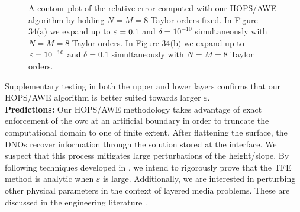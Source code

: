 \begin{figure}[H]
    \centering
    \vspace{3 mm}
    \caption{A contour plot of the relative error computed with our HOPS/AWE algorithm by holding $N=M=8$ Taylor orders fixed. In Figure $34\text{(a)}$ we expand up to $\varepsilon = 0.1$ and $\delta = 10^{-10}$ simultaneously with $N=M=8$ Taylor orders. In Figure $34\text{(b)}$ we expand up to $\varepsilon = 10^{-10}$ and $\delta = 0.1$ simultaneously with $N=M=8$ Taylor orders.}%
    \label{fig:example}%
\end{figure}
\vspace{-18mm}
Supplementary testing in both the upper and lower layers confirms that our HOPS/AWE algorithm is better suited towards larger $\varepsilon$.
\newline
\\
\textbf{Predictions:} Our HOPS/AWE methodology takes advantage of exact enforcement of the \gls{owc} at an artificial boundary in order to truncate the computational domain to one of finite extent. After flattening the surface, the DNOs recover information through the solution stored at the interface. We suspect that this process mitigates large perturbations of the height/slope. By following techniques developed in \cite{NichollsReitich00b,NichollsTaber06,Nicholls16b,NichollsShen08}, we intend to rigorously prove that the TFE method is analytic when $\varepsilon$ is large. Additionally, we are interested in perturbing other physical parameters in the context of layered media problems. These are discussed in the engineering literature \cite{mashayekh2018parameter,mashayekh2018parameter2}.